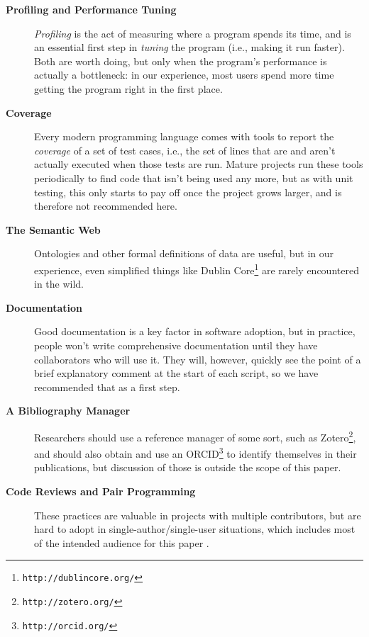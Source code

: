 \documentclass[10pt]{article}
\newcommand{\withurl}[2]{{#1}\footnote{\texttt{#2}}}
\begin{document}
\begin{description}
\item[\textbf{Profiling and Performance Tuning}] \emph{Profiling} is
  the act of measuring where a program spends its time, and is an
  essential first step in \emph{tuning} the program (i.e., making it
  run faster). Both are worth doing, but only when the program's
  performance is actually a bottleneck: in our experience, most users
  spend more time getting the program right in the first place.

\item[\textbf{Coverage}] Every modern programming language comes with
  tools to report the \emph{coverage} of a set of test cases, i.e.,
  the set of lines that are and aren't actually executed when those
  tests are run. Mature projects run these tools periodically to find
  code that isn't being used any more, but as with unit testing, this
  only starts to pay off once the project grows larger, and is
  therefore not recommended here.

\item[\textbf{The Semantic Web}] Ontologies and other formal
  definitions of data are useful, but in our experience, even
  simplified things like \withurl{Dublin Core}{http://dublincore.org/}
  are rarely encountered in the wild.

\item[\textbf{Documentation}] Good documentation is a key factor in
  software adoption, but in practice, people won't write comprehensive
  documentation until they have collaborators who will use it. They
  will, however, quickly see the point of a brief explanatory comment
  at the start of each script, so we have recommended that as a first
  step.

\item[\textbf{A Bibliography Manager}] Researchers should use a
  reference manager of some sort, such as
  \withurl{Zotero}{http://zotero.org/}, and should also obtain and use
  an \withurl{ORCID}{http://orcid.org/} to identify themselves in
  their publications, but discussion of those is outside the scope of
  this paper.

\item[\textbf{Code Reviews and Pair Programming}] These practices are
  valuable in projects with multiple contributors, but are hard to
  adopt in single-author/single-user situations, which includes most
  of the intended audience for this paper \cite{petre2014}.

\end{description}
\end{document}
